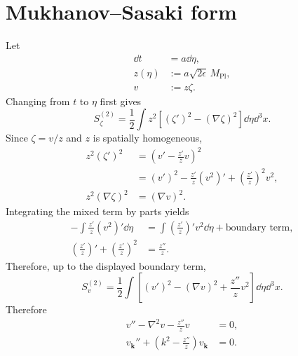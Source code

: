 \section{Mukhanov--Sasaki form}
Let
\begin{align}
\dd t&=a\dd\eta,\\
z(\eta)&:=a\sqrt{2\epsilon}\,M_{\mathrm{Pl}},\\
v&:=z\zeta.
\end{align}
Changing from \(t\) to \(\eta\) first gives
\begin{equation}
S_\zeta^{(2)}
=\frac12\int z^2
\left[(\zeta')^2-(\nabla\zeta)^2\right]
\dd\eta\dd^3x.
\end{equation}
Since \(\zeta=v/z\) and \(z\) is spatially homogeneous,
\begin{align}
z^2(\zeta')^2
&=\left(v'-\frac{z'}{z}v\right)^2\\
&=(v')^2
-\frac{z'}{z}(v^2)'
+\left(\frac{z'}{z}\right)^2v^2,\\
z^2(\nabla\zeta)^2&=(\nabla v)^2.
\end{align}
Integrating the mixed term by parts yields
\begin{align}
-\int\frac{z'}{z}(v^2)'\dd\eta
&=\int
\left(\frac{z'}{z}\right)'v^2\dd\eta
+\text{boundary term},\\
\left(\frac{z'}{z}\right)'
+\left(\frac{z'}{z}\right)^2
&=\frac{z''}{z}.
\end{align}
Therefore, up to the displayed boundary term,
\begin{equation}
\boxed{
S_v^{(2)}
=\frac12\int
\left[
(v')^2-(\nabla v)^2+\frac{z''}{z}v^2
\right]\dd\eta\dd^3x.
}
\end{equation}
Therefore
\begin{align}
v''-\nabla^2v-\frac{z''}{z}v&=0,\\
v_{\bm k}''+
\left(k^2-\frac{z''}{z}\right)v_{\bm k}&=0.
\end{align}


